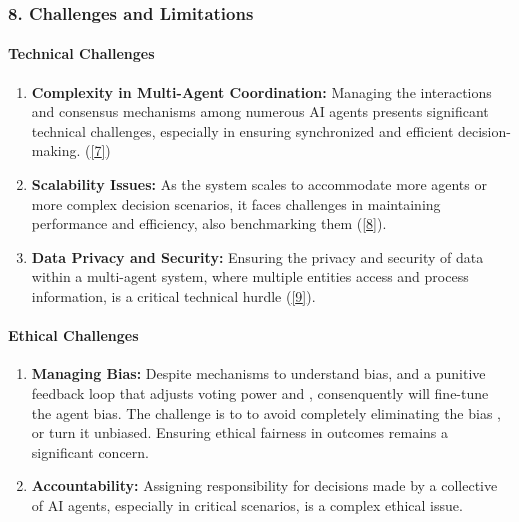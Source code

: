 \hypertarget{challenges-and-limitations}{%
\subsubsection{8. Challenges and
Limitations}\label{challenges-and-limitations}}

\hypertarget{technical-challenges}{%
\paragraph{Technical Challenges}\label{technical-challenges}}

\begin{enumerate}
\def\labelenumi{\arabic{enumi}.}
\item
  \textbf{Complexity in Multi-Agent Coordination:} Managing the
  interactions and consensus mechanisms among numerous AI agents
  presents significant technical challenges, especially in ensuring
  synchronized and efficient decision-making.
  (\protect\hyperlink{7}{{[}7{]}})
\item
  \textbf{Scalability Issues:} As the system scales to accommodate more
  agents or more complex decision scenarios, it faces challenges in
  maintaining performance and efficiency, also benchmarking them
  (\protect\hyperlink{8}{{[}8{]}}).
\item
  \textbf{Data Privacy and Security:} Ensuring the privacy and security
  of data within a multi-agent system, where multiple entities access
  and process information, is a critical technical hurdle
  (\protect\hyperlink{9}{{[}9{]}}).
\end{enumerate}

\hypertarget{ethical-challenges}{%
\paragraph{Ethical Challenges}\label{ethical-challenges}}

\begin{enumerate}
\def\labelenumi{\arabic{enumi}.}
\item
  \textbf{Managing Bias:} Despite mechanisms to understand bias, and a
  punitive feedback loop that adjusts voting power and , consenquently
  will fine-tune the agent bias. The challenge is to to avoid completely
  eliminating the bias , or turn it unbiased. Ensuring ethical fairness
  in outcomes remains a significant concern.
\item
  \textbf{Accountability:} Assigning responsibility for decisions made
  by a collective of AI agents, especially in critical scenarios, is a
  complex ethical issue.
\end{enumerate}

